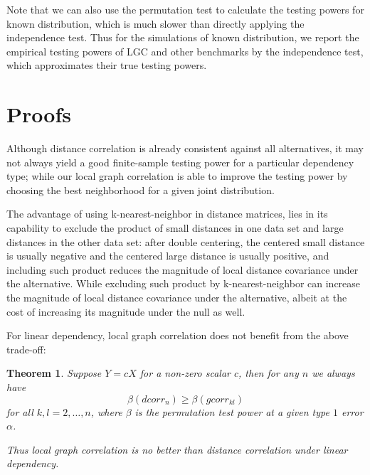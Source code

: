 \documentclass[11pt]{article}
\newtheorem{thm}{Theorem}
\begin{document}
Note that we can also use the permutation test to calculate the testing powers for known distribution, which is much slower than directly applying the independence test.
Thus for the simulations of known distribution, we report the empirical testing powers of LGC and other benchmarks by the independence test, which approximates their true testing powers.


\section{Proofs}

Although distance correlation is already consistent against all alternatives, it may not always yield a good finite-sample testing power for a particular dependency type; while our local graph correlation is able to improve the testing power by choosing the best neighborhood for a given joint distribution. 


The advantage of using k-nearest-neighbor in distance matrices, lies in its capability to exclude the product of small distances in one data set and large distances in the other data set: after double centering, the centered small distance is usually negative and the centered large distance is usually positive, and including such product reduces the magnitude of local distance covariance under the alternative. While excluding such product by k-nearest-neighbor can increase the magnitude of local distance covariance under the alternative, albeit at the cost of increasing its magnitude under the null as well. 


For linear dependency, local graph correlation does not benefit from the above trade-off:

\begin{thm}
\label{thm2}
Suppose $Y=cX$ for a non-zero scalar $c$, then for any $n$ we always have
\begin{equation}
\label{equ1}
\beta(dcorr_{n}) \geq \beta(gcorr_{kl})
\end{equation}
for all $k,l=2,\ldots,n$, where $\beta$ is the permutation test power at a given type $1$ error $\alpha$.

Thus local graph correlation is no better than distance correlation under linear dependency.
\end{thm}





\end{document}
